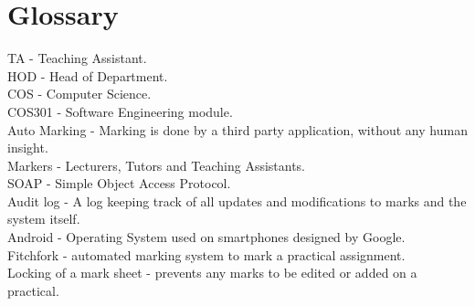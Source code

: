 \documentclass[12pt, a4paper]{scrartcl}
\begin{document}
		\section{Glossary}
		TA - Teaching Assistant.\\
		HOD - Head of Department.\\
		COS - Computer Science.\\
		COS301 - Software Engineering module.\\
		Auto Marking - Marking is done by a third party application, without any human insight.\\
		Markers - Lecturers, Tutors and Teaching Assistants.\\
		SOAP - Simple Object Access Protocol.\\
		Audit log - A log keeping track of all updates and modifications to marks and the system itself.\\
		Android - Operating System used on smartphones designed by Google.\\
		Fitchfork - automated marking system to mark a practical assignment.\\
		Locking of a mark sheet - prevents any marks to be edited or added on a practical. 
\end{document}
